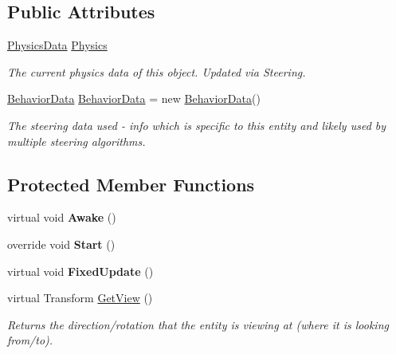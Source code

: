 \subsection*{Public Attributes}
\begin{DoxyCompactItemize}
\item 
\hyperlink{class_skyrates_1_1_common_1_1_a_i_1_1_physics_data}{Physics\-Data} \hyperlink{class_skyrates_1_1_common_1_1_entity_1_1_entity_dynamic_a2cc825f563606d4d565a4b0de1feab19}{Physics}
\begin{DoxyCompactList}\small\item\em The current physics data of this object. Updated via Steering. \end{DoxyCompactList}\item 
\hyperlink{class_skyrates_1_1_common_1_1_a_i_1_1_behavior_data}{Behavior\-Data} \hyperlink{class_skyrates_1_1_common_1_1_entity_1_1_entity_dynamic_a8b6d04f21affcb2359457f7998313663}{Behavior\-Data} = new \hyperlink{class_skyrates_1_1_common_1_1_a_i_1_1_behavior_data}{Behavior\-Data}()
\begin{DoxyCompactList}\small\item\em The steering data used -\/ info which is specific to this entity and likely used by multiple steering algorithms. \end{DoxyCompactList}\end{DoxyCompactItemize}
\subsection*{Protected Member Functions}
\begin{DoxyCompactItemize}
\item 
\hypertarget{class_skyrates_1_1_common_1_1_entity_1_1_entity_dynamic_a2364ce439984919790139305d2d2f91b}{virtual void {\bfseries Awake} ()}\label{class_skyrates_1_1_common_1_1_entity_1_1_entity_dynamic_a2364ce439984919790139305d2d2f91b}

\item 
\hypertarget{class_skyrates_1_1_common_1_1_entity_1_1_entity_dynamic_a0e3f4c361734de124f27ed7d331bd12c}{override void {\bfseries Start} ()}\label{class_skyrates_1_1_common_1_1_entity_1_1_entity_dynamic_a0e3f4c361734de124f27ed7d331bd12c}

\item 
\hypertarget{class_skyrates_1_1_common_1_1_entity_1_1_entity_dynamic_adc9f4729654d4c86a404c0ccd966ccd3}{virtual void {\bfseries Fixed\-Update} ()}\label{class_skyrates_1_1_common_1_1_entity_1_1_entity_dynamic_adc9f4729654d4c86a404c0ccd966ccd3}

\item 
virtual Transform \hyperlink{class_skyrates_1_1_common_1_1_entity_1_1_entity_dynamic_a7d214d221e4933f54528a707da1cc129}{Get\-View} ()
\begin{DoxyCompactList}\small\item\em Returns the direction/rotation that the entity is viewing at (where it is looking from/to). \end{DoxyCompactList}\end{DoxyCompactItemize}

